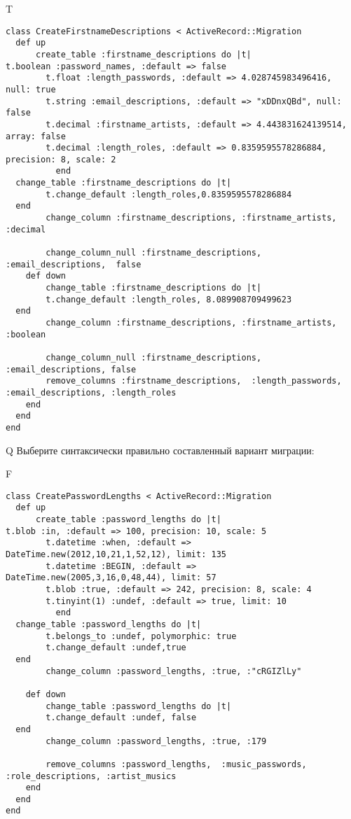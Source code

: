 T
\begin{verbatim}
class CreateFirstnameDescriptions < ActiveRecord::Migration
  def up
	  create_table :firstname_descriptions do |t|
t.boolean :password_names, :default => false
		t.float :length_passwords, :default => 4.028745983496416, null: true
		t.string :email_descriptions, :default => "xDDnxQBd", null: false
		t.decimal :firstname_artists, :default => 4.443831624139514, array: false
		t.decimal :length_roles, :default => 0.8359595578286884, precision: 8, scale: 2
		  end
  change_table :firstname_descriptions do |t|
		t.change_default :length_roles,0.8359595578286884
  end
 		change_column :firstname_descriptions, :firstname_artists, :decimal
   
		change_column_null :firstname_descriptions, :email_descriptions,  false
	def down
		change_table :firstname_descriptions do |t|
		t.change_default :length_roles, 8.089908709499623
  end
 		change_column :firstname_descriptions, :firstname_artists, :boolean
   
		change_column_null :firstname_descriptions, :email_descriptions, false
 		remove_columns :firstname_descriptions,  :length_passwords, :email_descriptions, :length_roles 
    end 
  end
end

\end{verbatim}

Q
Выберите синтаксически правильно составленный вариант миграции:

F
\begin{verbatim}
class CreatePasswordLengths < ActiveRecord::Migration
  def up
	  create_table :password_lengths do |t|
t.blob :in, :default => 100, precision: 10, scale: 5
		t.datetime :when, :default => DateTime.new(2012,10,21,1,52,12), limit: 135
		t.datetime :BEGIN, :default => DateTime.new(2005,3,16,0,48,44), limit: 57
		t.blob :true, :default => 242, precision: 8, scale: 4
		t.tinyint(1) :undef, :default => true, limit: 10
		  end
  change_table :password_lengths do |t|
		t.belongs_to :undef, polymorphic: true
 		t.change_default :undef,true
  end
 		change_column :password_lengths, :true, :"cRGIZlLy"
   
	def down
		change_table :password_lengths do |t|
		t.change_default :undef, false
  end
 		change_column :password_lengths, :true, :179
   
		remove_columns :password_lengths,  :music_passwords, :role_descriptions, :artist_musics 
    end 
  end
end

\end{verbatim}

